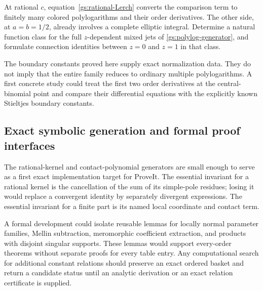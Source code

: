 At rational $c$, equation~\eqref{gs:rational-Lerch} converts the comparison
term to finitely many colored polylogarithms and their order derivatives.
The other side, at $a=b=1/2$, already involves a complete elliptic
integral.  Determine a natural function class for the full
$z$-dependent mixed jets of \eqref{gs:polylog-generator}, and formulate
connection identities between $z=0$ and $z=1$ in that class.

The boundary constants proved here supply exact normalization data.
They do not imply that the entire family reduces to ordinary multiple
polylogarithms.  A first concrete study could treat the first two order
derivatives at the central-binomial point and compare their differential
equations with the explicitly known Stieltjes boundary constants.

\subsection{Exact symbolic generation and formal proof interfaces}

The rational-kernel and contact-polynomial generators are small enough
to serve as a first exact implementation target for ProveIt.  The
essential invariant for a rational kernel is the cancellation of the
sum of its simple-pole residues; losing it would replace a convergent
identity by separately divergent expressions.  The essential invariant
for a finite part is its named local coordinate and contact term.

A formal development could isolate reusable lemmas for locally normal
parameter families, Mellin subtraction, meromorphic coefficient
extraction, and products with disjoint singular supports.  These lemmas
would support every-order theorems without separate proofs for every
table entry.  Any computational search for additional constant
relations should preserve an exact ordered basket and return a
candidate status until an analytic derivation or an exact relation
certificate is supplied.
